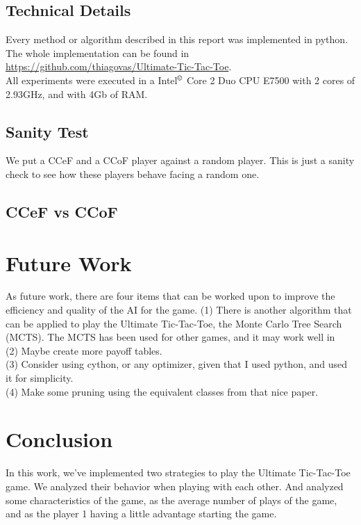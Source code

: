 \documentclass[10pt]{article}
\begin{document}
\subsection{Technical Details}
Every method or algorithm described in this report was implemented in python. The whole implementation can be found in \url{https://github.com/thiagovas/Ultimate-Tic-Tac-Toe}.\\
All experiments were executed in a Intel$^\copyright$ Core {\tiny\texttrademark} 2 Duo CPU E7500 with 2 cores of 2.93GHz, and with 4Gb of RAM.

\subsection{Sanity Test}
We put a CCeF and a CCoF player against a random player. This is just a sanity check to see how these players behave facing a random one.



\subsection{CCeF vs CCoF}



\section{Future Work}
As future work, there are four items that can be worked upon to improve the efficiency and quality of the AI for the game.
(1) There is another algorithm that can be applied to play the Ultimate Tic-Tac-Toe, the Monte Carlo Tree Search (MCTS). The MCTS has been used for other games, and it may work well in \\
(2) Maybe create more payoff tables.\\
(3) Consider using cython, or any optimizer, given that I used python, and used it for simplicity.\\
(4) Make some pruning using the equivalent classes from that nice paper.


\section{Conclusion}
In this work, we've implemented two strategies to play the Ultimate Tic-Tac-Toe game. We analyzed their behavior when playing with each other. And analyzed some characteristics of the game, as the average number of plays of the game, and as the player 1 having a little advantage starting the game.


{}

\end{document}
